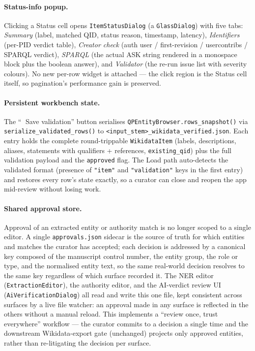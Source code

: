 \documentclass[12pt]{article}
\newcommand{\code}[1]{\texttt{#1}}
\begin{document}
\paragraph{Status-info popup.}
Clicking a Status cell opens \code{ItemStatusDialog} (a \code{GlassDialog}) with five tabs: \emph{Summary} (label, matched QID, status reason, timestamp, latency), \emph{Identifiers} (per-PID verdict table), \emph{Creator check} (auth user / first-revision / usercontribs / SPARQL verdict), \emph{SPARQL} (the actual ASK string rendered in a monospace block plus the boolean answer), and \emph{Validator} (the re-run issue list with severity colours). No new per-row widget is attached — the click region is the Status cell itself, so pagination's performance gain is preserved.

\paragraph{Persistent workbench state.}
The ``💾 Save validation'' button serialises \code{QPEntityBrowser.rows\_snapshot()} via \code{serialize\_validated\_rows()} to \code{<input\_stem>\_wikidata\_verified.json}. Each entry holds the complete round-trippable \code{WikidataItem} (labels, descriptions, aliases, statements with qualifiers + references, \code{existing\_qid}) plus the full validation payload and the \code{approved} flag. The Load path auto-detects the validated format (presence of \code{"item"} and \code{"validation"} keys in the first entry) and restores every row's state exactly, so a curator can close and reopen the app mid-review without losing work.

\paragraph{Shared approval store.}
Approval of an extracted entity or authority match is no longer scoped to a single editor. A single \code{approvals.json} sidecar is the source of truth for which entities and matches the curator has accepted; each decision is addressed by a canonical key composed of the manuscript control number, the entity group, the role or type, and the normalised entity text, so the same real-world decision resolves to the same key regardless of which surface recorded it. The NER editor (\code{ExtractionEditor}), the authority editor, and the AI-verdict review UI (\code{AiVerificationDialog}) all read and write this one file, kept consistent across surfaces by a live file watcher: an approval made in any surface is reflected in the others without a manual reload. This implements a ``review once, trust everywhere'' workflow — the curator commits to a decision a single time and the downstream Wikidata-export gate (unchanged) projects only approved entities, rather than re-litigating the decision per surface.
\end{document}
